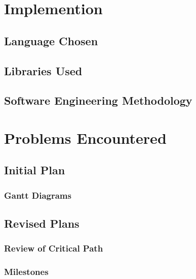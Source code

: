 \documentclass[a4paper,12pt]{report}
\begin{document}



\chapter{Implemention}

\section{Language Chosen}



\section{Libraries Used}



\section{Software Engineering Methodology}




\chapter{Problems Encountered}

\section{Initial Plan}

\todo

\subsection{Gantt Diagrams}

\todo

\section{Revised Plans}

\todo

\subsection{Review of Critical Path}

\todo

\subsection{Milestones}
\end{document}
